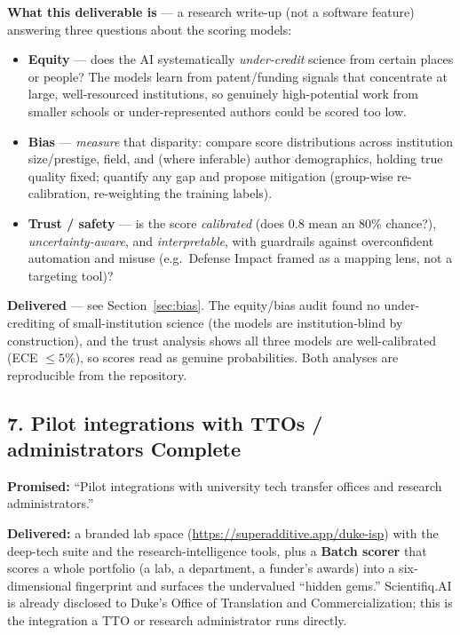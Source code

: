 \documentclass[11pt]{article}
\newcommand{\stDone}{\textbf{\textcolor{good}{Complete}}}
\begin{document}
\textbf{What this deliverable is} --- a research write-up (not a software feature)
answering three questions about the scoring models:
\begin{itemize}[leftmargin=1.4em, itemsep=2pt]
  \item \textbf{Equity} --- does the AI systematically \emph{under-credit} science
  from certain places or people? The models learn from patent/funding signals that
  concentrate at large, well-resourced institutions, so genuinely high-potential
  work from smaller schools or under-represented authors could be scored too low.
  \item \textbf{Bias} --- \emph{measure} that disparity: compare score
  distributions across institution size/prestige, field, and (where inferable)
  author demographics, holding true quality fixed; quantify any gap and propose
  mitigation (group-wise re-calibration, re-weighting the training labels).
  \item \textbf{Trust / safety} --- is the score \emph{calibrated} (does 0.8 mean
  an 80\% chance?), \emph{uncertainty-aware}, and \emph{interpretable}, with
  guardrails against overconfident automation and misuse (e.g.\ Defense Impact
  framed as a mapping lens, not a targeting tool)?
\end{itemize}
\textbf{Delivered} --- see Section~\ref{sec:bias}. The equity/bias audit found no
under-crediting of small-institution science (the models are institution-blind by
construction), and the trust analysis shows all three models are well-calibrated
(ECE $\leq 5\%$), so scores read as genuine probabilities. Both analyses are
reproducible from the repository.

\subsection{7. Pilot integrations with TTOs / administrators \hfill \stDone}
\textbf{Promised:} ``Pilot integrations with university tech transfer offices and
research administrators.''

\textbf{Delivered:} a branded lab space (\url{https://superadditive.app/duke-isp})
with the deep-tech suite and the research-intelligence tools, plus a \textbf{Batch
scorer} that scores a whole portfolio (a lab, a department, a funder's awards) into
a six-dimensional fingerprint and surfaces the undervalued ``hidden gems.'' Scientifiq.AI
is already disclosed to Duke's Office of Translation and Commercialization; this is
the integration a TTO or research administrator runs directly.
\end{document}
